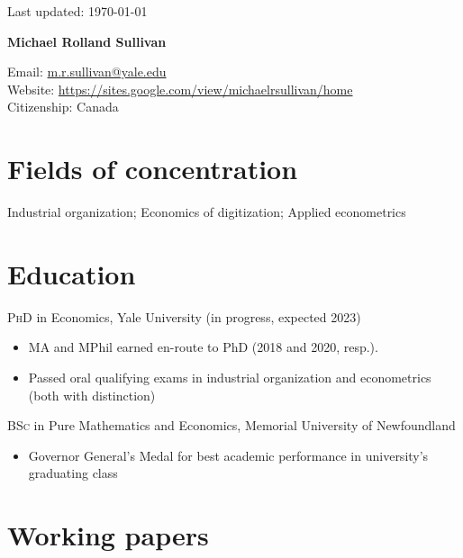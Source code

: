 \documentclass[11pt]{article} %
\begin{document}
 \begin{flushright}
   \scriptsize
	Last updated: \today
   \normalsize
\end{flushright}
{\LARGE\bfseries Michael Rolland Sullivan} %
\bigskip\bigskip\medskip %

\medskip %

Email: \href{mailto:m.r.sullivan@yale.edu}{m.r.sullivan@yale.edu}\\ 
Website: \href{https://sites.google.com/view/michaelrsullivan/home}{https://sites.google.com/view/michaelrsullivan/home}\\ 

Citizenship: Canada 

\section*{Fields of concentration}

Industrial organization; Economics of digitization; Applied econometrics 

\section*{Education}

\textsc{PhD} in Economics, Yale University (in progress, expected 2023)
\begin{itemize}
	\item MA and MPhil earned en-route to PhD (2018 and 2020, resp.).
	\item Passed oral qualifying exams in industrial organization and econometrics (both with distinction)
\end{itemize}

\textsc{BSc} in Pure Mathematics and Economics, Memorial University of Newfoundland
\begin{itemize}
	\item Governor General's Medal for best academic performance in university's graduating class
\end{itemize}

\section*{Working papers}
\end{document}

